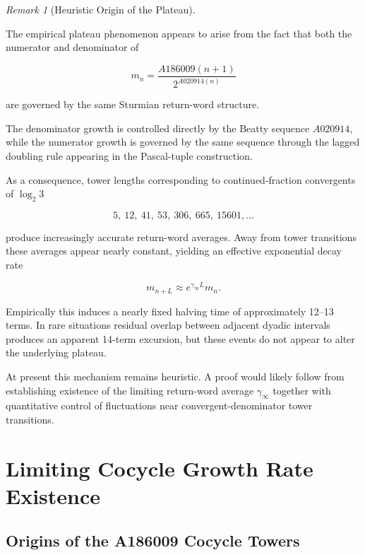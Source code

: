 \documentclass[12pt, oneside]{article}
\numberwithin{equation}{section}
\theoremstyle{definition}
\theoremstyle{plain}
\theoremstyle{remark}
\newtheorem*{remark}{Remark}
\begin{document}
\begin{remark}[Heuristic Origin of the Plateau]
\label{rem:plateau-heuristic}

The empirical plateau phenomenon appears to arise from the fact that
both the numerator and denominator of

\[
m_n
=
\frac{A186009(n+1)}
     {2^{A020914(n)}}
\]

are governed by the same Sturmian return-word structure.

The denominator growth is controlled directly by the Beatty sequence
\(A020914\), while the numerator growth is governed by the same
sequence through the lagged doubling rule appearing in the Pascal-tuple
construction.

As a consequence, tower lengths corresponding to continued-fraction
convergents of \(\log_2 3\)

\[
5,\ 12,\ 41,\ 53,\ 306,\ 665,\ 15601,\ldots
\]

produce increasingly accurate return-word averages. Away from tower
transitions these averages appear nearly constant, yielding an
effective exponential decay rate

\[
m_{n+L}
\approx
e^{\gamma_\infty L} m_n.
\]

Empirically this induces a nearly fixed halving time of approximately
12--13 terms. In rare situations residual overlap between adjacent
dyadic intervals produces an apparent 14-term excursion, but these
events do not appear to alter the underlying plateau.

At present this mechanism remains heuristic. A proof would likely
follow from establishing existence of the limiting return-word average
\(\gamma_\infty\) together with quantitative control of fluctuations
near convergent-denominator tower transitions.
\end{remark}


\section{Limiting Cocycle Growth Rate Existence}
\label{sec:limiting-cocycle-growth}

\subsection{Origins of the A186009 Cocycle Towers}
\label{subsec:cocycle-origins}
\end{document}
